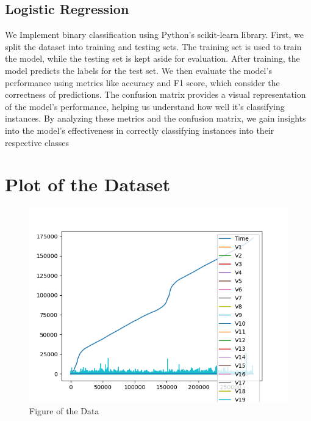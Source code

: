 \subsection{Logistic Regression}
 We Implement binary classification using Python's scikit-learn library. First, we split the dataset into training and testing sets. The training set is used to train the model, while the testing set is kept aside for evaluation. After training, the model predicts the labels for the test set. We then evaluate the model's performance using metrics like accuracy and F1 score, which consider the correctness of predictions. The confusion matrix provides a visual representation of the model's performance, helping us understand how well it's classifying instances. By analyzing these metrics and the confusion matrix, we gain insights into the model's effectiveness in correctly classifying instances into their respective classes


\section{Plot of the Dataset}


\begin{figure}[ht]
    \centering
    \includegraphics[scale=0.3]{figures/BasicPlot.png}
    \caption{Figure of the Data}
    \label{fig:Plot of the Data}
\end{figure}
\

